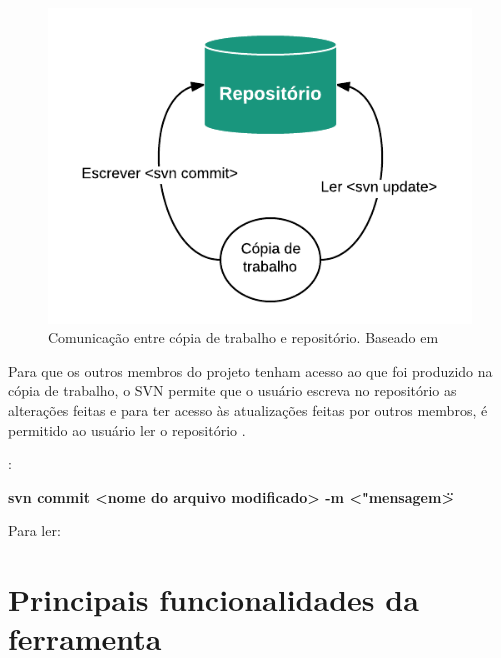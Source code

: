 \begin{figure}[!htb]
\centering
\includegraphics[scale=1]{figuras/repositorio_copia.png}
\caption{Comunicação entre cópia de trabalho e repositório. Baseado em \cite{svn-book}}
\end{figure}


Para que os outros membros do projeto tenham acesso ao que foi produzido na cópia de trabalho, o SVN permite que o usuário escreva no repositório as alterações feitas
e para ter acesso às atualizações feitas por outros membros, é permitido ao usuário ler o repositório \cite{svn-book}.

\begin{multicols}{2} 


:{

\colorbox{PineGreen}{
\begin{minipage}{210px}
  \textbf{svn commit <nome do arquivo modificado> -m <"mensagem\">}
\end{minipage}
}
}

Para ler:

\colorbox{PineGreen}{
\begin{minipage}{200px}
\end{minipage}
}

\end{multicols}

\section{Principais funcionalidades da ferramenta}

